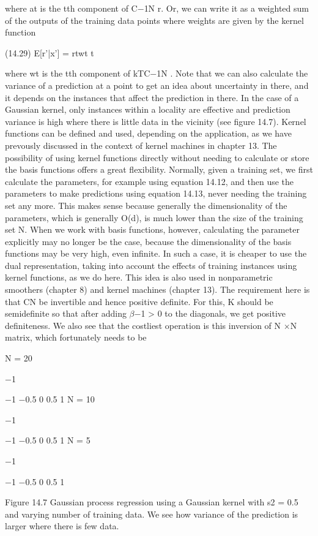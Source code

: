 where at is the tth component of C$-$1N r. Or, we can write it as a weighted sum of the outputs of the training data points where weights are given by the kernel function

(14.29) E[r'|x'] = rtwt t

where wt is the tth component of kTC$-$1N . Note that we can also calculate the variance of a prediction at a point to get an idea about uncertainty in there, and it depends on the instances that affect the prediction in there. In the case of a Gaussian kernel, only instances within a locality are effective and prediction variance is high where there is little data in the vicinity (see figure 14.7). Kernel functions can be defined and used, depending on the application, as we have prevously discussed in the context of kernel machines in chapter 13. The possibility of using kernel functions directly without needing to calculate or store the basis functions offers a great flexibility. Normally, given a training set, we first calculate the parameters, for example using equation 14.12, and then use the parameters to make predictions using equation 14.13, never needing the training set any more. This makes sense because generally the dimensionality of the parameters, which is generally O(d), is much lower than the size of the training set N. When we work with basis functions, however, calculating the parameter explicitly may no longer be the case, because the dimensionality of the basis functions may be very high, even infinite. In such a case, it is cheaper to use the dual representation, taking into account the effects of training instances using kernel functions, as we do here. This idea is also used in nonparametric smoothers (chapter 8) and kernel machines (chapter 13). The requirement here is that CN be invertible and hence positive definite. For this, K should be semidefinite so that after adding $\beta$$-$1 > 0 to the diagonals, we get positive definiteness. We also see that the costliest operation is this inversion of N $\times$N matrix, which fortunately needs to be

N = 20

$-$1

$-$1 $-$0.5 0 0.5 1 N = 10

$-$1

$-$1 $-$0.5 0 0.5 1 N = 5

$-$1

$-$1 $-$0.5 0 0.5 1

Figure 14.7 Gaussian process regression using a Gaussian kernel with s2 = 0.5 and varying number of training data. We see how variance of the prediction is larger where there is few data.

